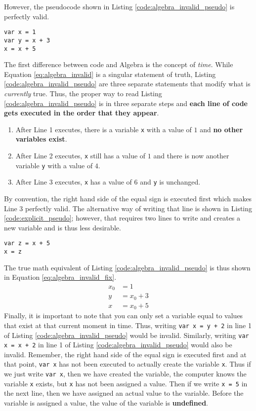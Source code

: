 \documentclass{article}
\begin{document}
However, the pseudocode shown in Listing \ref{code:algebra_invalid_pseudo} is perfectly valid.
\begin{lstlisting}[caption={The equivalent of Equation \ref{eq:algebra_invalid} in our pseudo-language.}, label={code:algebra_invalid_pseudo}]
var x = 1
var y = x + 3
x = x + 5
\end{lstlisting}
The first difference between code and Algebra is the concept of \textit{time}.
While Equation \ref{eq:algebra_invalid} is a singular statement of truth, Listing \ref{code:algebra_invalid_pseudo} are three separate statements that modify what is \textit{currently} true.
Thus, the proper way to read Listing \ref{code:algebra_invalid_pseudo} is in three separate steps and \textbf{each line of code gets executed in the order that they appear}.
\begin{enumerate}
\item After Line 1 executes, there is a variable \lstinline{x} with a value of $1$ and \textbf{no other variables exist}.
\item After Line 2 executes, \lstinline{x} still has a value of $1$ and there is now another variable \lstinline{y} with a value of $4$.
\item After Line 3 executes, \lstinline{x} has a value of $6$ and \lstinline{y} is unchanged.
\end{enumerate}
By convention, the right hand side of the equal sign is executed first which makes Line 3 perfectly valid.
The alternative way of writing that line is shown in Listing \ref{code:explicit_pseudo}; however, that requires two lines to write and creates a new variable and is thus less desirable.
\begin{lstlisting}[caption={A more explicit $x = x + 5$.}, label={code:explicit_pseudo}]
var z = x + 5
x = z
\end{lstlisting}
The true math equivalent of Listing \ref{code:algebra_invalid_pseudo} is thus shown in Equation \ref{eq:algebra_invalid_fix}.
\begin{equation}
\begin{aligned}
x_0 & = 1 \\
y & = x_0 + 3 \\
x & = x_0 + 5
\end{aligned}
\label{eq:algebra_invalid_fix}
\end{equation}
Finally, it is important to note that you can only set a variable equal to values that exist at that current moment in time.
Thus, writing \lstinline{var x = y + 2} in line 1 of Listing \ref{code:algebra_invalid_pseudo} would be invalid.
Similarly, writing \lstinline{var x = x + 2} in line 1 of Listing \ref{code:algebra_invalid_pseudo} would also be invalid.
Remember, the right hand side of the equal sign is executed first and at that point, \lstinline{var x} has not been executed to actually create the variable \lstinline{x}.
Thus if we just write \lstinline{var x}, then we have created the variable, the computer knows the variable \lstinline{x} exists, but \lstinline{x} has not been assigned a value.
Then if we write \lstinline{x = 5} in the next line, then we have assigned an actual value to the variable.
Before the variable is assigned a value, the value of the variable is \textbf{undefined}.
\end{document}
